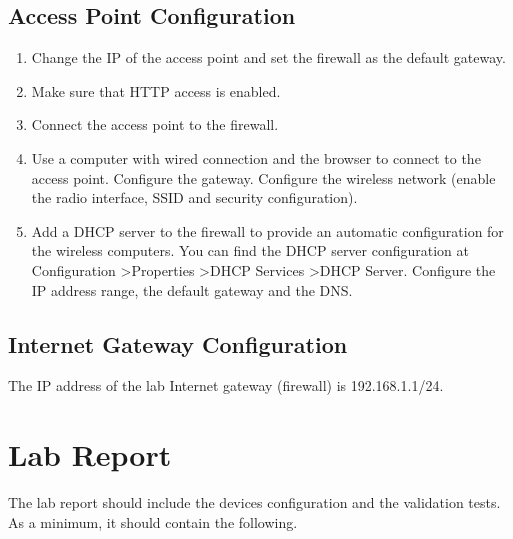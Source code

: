 \subsection{Access Point Configuration}

\begin{enumerate}
\item Change the IP of the access point and set the firewall as the default gateway.
\item Make sure that HTTP access is enabled.
\item Connect the access point to the firewall.
\item Use a computer with wired connection and the browser to connect to the access point. Configure the gateway. Configure the wireless network (enable the radio interface, SSID and security configuration).
\item Add a DHCP server to the firewall to provide an automatic configuration for the wireless computers. You can find the DHCP server configuration at \textsf{Configuration} \textgreater \textsf{Properties} \textgreater \textsf{DHCP Services} \textgreater \textsf{DHCP Server}. Configure the IP address range, the default gateway and the DNS.
\end{enumerate}

\subsection{Internet Gateway Configuration}

The IP address of the lab Internet gateway (firewall) is 192.168.1.1/24.

\section{Lab Report}

The lab report should include the devices configuration and the validation tests. As a minimum, it should contain the following.

